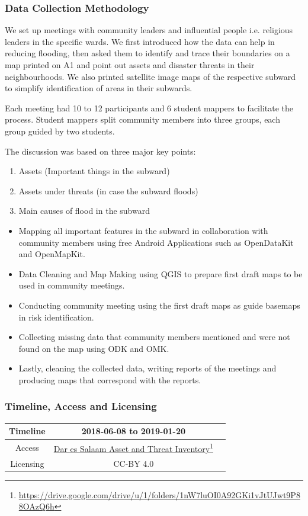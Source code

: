 \documentclass[a4paper,12pt,twoside]{article}
\begin{document}
\subsubsection{Data Collection Methodology}
We set up meetings with community leaders and influential people i.e. religious leaders in the specific wards. We first introduced how the data can help in reducing flooding, then asked them to identify and trace their boundaries on a map printed on A1 and point out assets and disaster threats in their neighbourhoods. We also printed satellite image maps of the respective subward to simplify identification of areas in their subwards.

Each meeting had 10 to 12 participants and 6 student mappers to facilitate the process. Student mappers split community members into three groups, each group guided by two students.

The discussion was based on three major key points:
\begin{enumerate}
    \item Assets (Important things in the subward)
    \item Assets under threats (in case the subward floods)
    \item Main causes of flood in the subward
\end{enumerate}

\begin{itemize}
    \item Mapping all important features in the subward in collaboration with community members using free Android Applications such as OpenDataKit and OpenMapKit.
    \item Data Cleaning and Map Making using QGIS to prepare first draft maps to be used in community meetings.
    \item Conducting community meeting using the first draft maps as guide basemaps in risk identification.
    \item Collecting missing data that community members mentioned and were not found on the map using ODK and OMK.
    \item Lastly, cleaning the collected data, writing reports of the meetings and producing maps that correspond with the reports.
\end{itemize}

\subsubsection{Timeline, Access and Licensing}
\begin{center}
\begin{tabular}{|c|c|c|}  
 \hline
  Timeline  &   2018-06-08 to 2019-01-20 \\
\hline  
 Access  & 
    \href{https://drive.google.com/drive/u/1/folders/1nW7luOI0A92GKi1vJtUJwt9P88OAzQ6h}{Dar es Salaam Asset and Threat Inventory}\footnote{\url{https://drive.google.com/drive/u/1/folders/1nW7luOI0A92GKi1vJtUJwt9P88OAzQ6h}} \\
   
\hline 
    Licensing & CC-BY 4.0 \\
\hline
\end{tabular}
\end{center}
\end{document}
